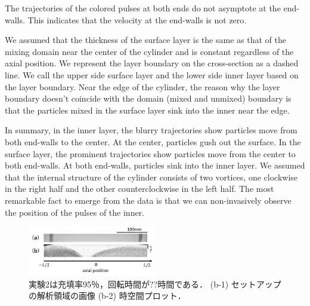 \documentclass[prl,twocolumn,superscriptaddress]{revtex4}
\begin{document}
The trajectories of the colored pulses at both ends do not asymptote at the end-walls. This indicates that the velocity at the end-walls is not zero.

We assumed that the thickness of the surface layer is the same as that of the mixing domain near the center of the cylinder and is constant regardless of the axial position. We represent the layer boundary on the cross-section as a dashed line. We call the upper side surface layer and the lower side inner layer based on the layer boundary. Near the edge of the cylinder, the reason why the layer boundary doesn't coincide with the domain (mixed and unmixed) boundary is that the particles mixed in the surface layer sink into the inner near the edge.

In summary, in the inner layer, the blurry trajectories show particles move from both end-walls to the center. At the center, particles gush out the surface. In the surface layer, the prominent trajectories show particles move from the center to both end-walls. At both end-walls, particles sink into the inner layer. We assumed that the internal structure of the cylinder consists of two vortices, one clockwise in the right half and the other counterclockwise in the left half. The most remarkable fact to emerge from the data is that we can non-invasively observe the position of the pulses of the inner.

\begin{figure}[tb]
	\centering
	\includegraphics[width=0.5\textwidth]{figure/42_gray.png}
	\caption{実験2は充填率95％，回転時間が??時間である． (b-1) セットアップの解析領域の画像  (b-2) 時空間プロット．}
	\label{fig:Expt.2}
\end{figure}
\end{document}
